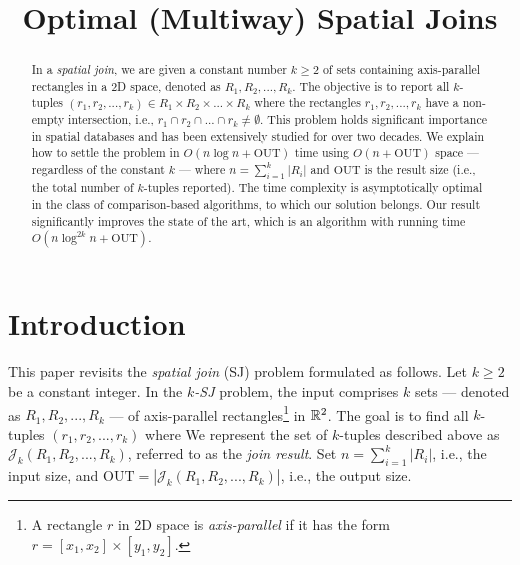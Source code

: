 \documentclass[sigconf]{acmart}
\def\J{\mathcal{J}}
\def\out{\mathrm{OUT}}
\begin{document}
    
\title{Optimal (Multiway) Spatial Joins}


\author{}


\begin{abstract}
    In a {\em spatial join}, we are given a constant number $k \geq 2$ of sets containing axis-parallel rectangles in a 2D space, denoted as $R_1, R_2, ..., R_k$. The objective is to report all $k$-tuples $(r_1, r_2, ..., r_k) \in R_1 \times R_2 \times ... \times R_k$ where the rectangles $r_1, r_2, ..., r_k$ have a non-empty intersection, i.e., $r_1 \cap r_2 \cap ... \cap r_k \neq \emptyset$. This problem holds significant importance in spatial databases and has been extensively studied for over two decades. We explain how to settle the problem in $O(n \log n + \out)$ time using $O(n + \out)$ space --- regardless of the constant $k$ --- where $n = \sum_{i=1}^k |R_i|$ and $\out$ is the result size (i.e., the total number of $k$-tuples reported). The time complexity is asymptotically optimal in the class of comparison-based algorithms, to which our solution belongs. Our result significantly improves the state of the art, which is an algorithm with running time $O(n \log^{2k} n + \out)$.
\end{abstract}

\maketitle 

\section{Introduction} \label{sec:intro}

This paper revisits the {\em spatial join} (SJ) problem formulated as follows. Let $k \ge 2$ be a constant integer. In the {\em $k$-SJ} problem, the input comprises $k$ sets --- denoted as $R_1, R_2, ..., R_k$ --- of axis-parallel rectangles\footnote{A rectangle $r$ in 2D space is {\em axis-parallel} if it has the form $r = [x_1, x_2] \times [y_1, y_2]$.} in $\mathbb{R}^2$. The goal is to find all $k$-tuples $(r_1, r_2, ..., r_k)$ where
We represent the set of $k$-tuples described above as $\J_k(R_1, R_2, ..., R_k)$, referred to as the {\em join result}. Set $n = \sum_{i=1}^k |R_i|$, i.e., the input size, and $\out = |\J_k(R_1, R_2, ..., R_k)|$, i.e., the output size.
\end{document}
